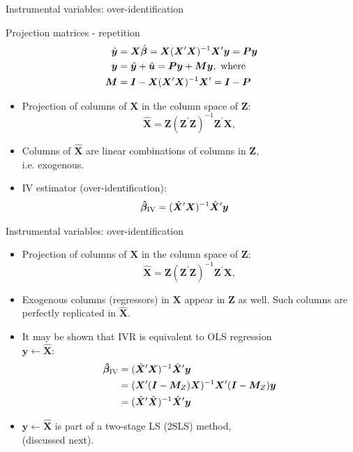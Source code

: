 \documentclass[usenames,dvipsnames]{beamer}
\begin{document}
\begin{frame}{Instrumental variables: over-identification}
\begin{block}{Projection matrices - repetition}
\vspace{-0.5cm}
\begin{align*} 
\hat{\bm{y}} & = \bm{X}\hat{\bm{\beta}} =  
\bm{X}(\bm{X}^{\prime}\bm{X})^{-1} \bm{X}^{\prime}\bm{y} = \bm{Py}\\
\bm{y} & = \hat{\bm{y}} + \hat{\bm{u}} = \bm{Py} + \bm{My}, \textnormal{~where} \\
\bm{M} & = \bm{I}  - \bm{X}(\bm{X}^{\prime}\bm{X})^{-1} \bm{X}^{\prime} = \bm{I} - \bm{P}
\end{align*}
\end{block}
\begin{itemize}
    \item Projection of columns of $\bm{X}$ in the column space of $\bm{Z}$:
$$
\hat{\bm{X}} = 
\bm{Z}(\bm{Z}^{\prime}\bm{Z})^{-1} \bm{Z}^{\prime}\bm{X},
$$
\item Columns of $\hat{\bm{X}}$ are linear combinations of columns in $\bm{Z}$, \\i.e. exogenous.
\medskip
\item IV estimator (over-identification):
\begin{align*}
 \bm{\hat{\beta}}_{\textnormal{IV}} &= (\hat{\bm{X}}^{\prime}\bm{X})^{-1} \hat{\bm{X}}^{\prime}\bm{y}
\end{align*}
\end{itemize}
\end{frame}
\begin{frame}{Instrumental variables: over-identification}
\begin{itemize} 
    \item Projection of columns of $\bm{X}$ in the column space of $\bm{Z}$:
$$
\hat{\bm{X}} = 
\bm{Z}(\bm{Z}^{\prime}\bm{Z})^{-1} \bm{Z}^{\prime}\bm{X},
$$
\item Exogenous columns (regressors) in $\bm{X}$ appear in $\bm{Z}$ as well. Such columns are perfectly replicated in $\hat{\bm{X}}$.
\medskip
\item It may be shown that IVR is equivalent to OLS regression \\$\bm{y} \leftarrow \hat{\bm{X}}$:
\begin{align*}
 \bm{\hat{\beta}}_{\textnormal{IV}} &= 
 (\hat{\bm{X}}^{\prime}\bm{X})^{-1} \hat{\bm{X}}^{\prime}\bm{y} \\
 &= (\bm{X}^{\prime}(\bm{I}-\bm{M}_Z)\bm{X})^{-1} \bm{X}^{\prime}(\bm{I}-\bm{M}_Z)\bm{y} \\
 &= (\hat{\bm{X}}^{\prime}\hat{\bm{X}})^{-1} \hat{\bm{X}}^{\prime}\bm{y}
\end{align*}
\item $\bm{y} \leftarrow \hat{\bm{X}}$ is part of a two-stage LS (2SLS) method, \\(discussed next).
\end{itemize}
\end{frame}
\end{document}
